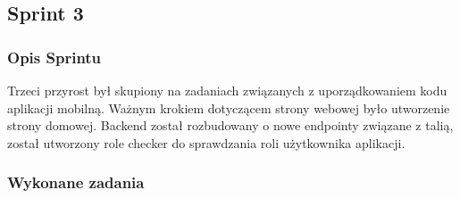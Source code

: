\subsection{Sprint 3}

\subsubsection{Opis Sprintu}
Trzeci przyrost był skupiony na zadaniach związanych z uporządkowaniem kodu aplikacji mobilną. Ważnym krokiem dotyczącem strony webowej było utworzenie strony domowej. Backend został rozbudowany o nowe endpointy związane z talią, został utworzony role checker do sprawdzania roli użytkownika aplikacji.

\subsubsection{Wykonane zadania}

